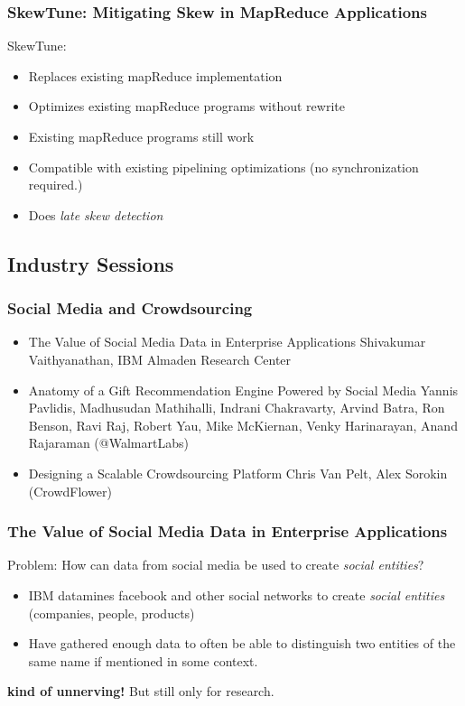 \begin{frame}[plain] %
\frametitle{SkewTune: Mitigating Skew in MapReduce Applications}

SkewTune:

\begin{itemize}
\item Replaces existing mapReduce implementation
\item Optimizes existing mapReduce programs without rewrite
\item Existing mapReduce programs still work
\item Compatible with existing pipelining optimizations  (no synchronization required.)
\item Does \textit{late skew detection}
\end{itemize}

\end{frame}



\subsection{Industry Sessions}

\begin{frame} %
\frametitle{Social Media and Crowdsourcing}
\begin{itemize}
\item The Value of Social Media Data in Enterprise Applications	
\ritem Shivakumar Vaithyanathan, IBM Almaden Research Center 

\item Anatomy of a Gift Recommendation Engine Powered by Social Media	
\ritem Yannis Pavlidis, Madhusudan Mathihalli, Indrani Chakravarty, Arvind Batra, Ron Benson, Ravi Raj, Robert Yau, Mike McKiernan, Venky Harinarayan, Anand Rajaraman (@WalmartLabs)

\item Designing a Scalable Crowdsourcing Platform	
\ritem Chris Van Pelt, Alex Sorokin (CrowdFlower)
\end{itemize}

\end{frame}


\begin{frame}[plain] %
\frametitle{The Value of Social Media Data in Enterprise Applications}


Problem: How can data from social media be used to create \textit{social entities}? 

\begin{itemize}
\item IBM datamines facebook and other social networks to create \textit{social entities} (companies, people, products)
\item Have gathered enough data to often be able to distinguish two entities of the same name if mentioned in some context.
\end{itemize}

\textbf{kind of unnerving!} But still only for research. 

\end{frame}

